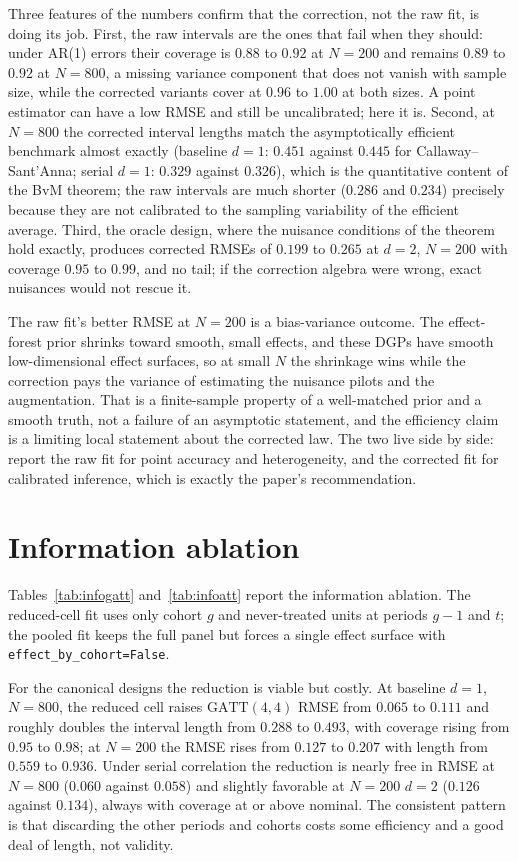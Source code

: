 \documentclass[11pt]{article}
\begin{document}
Three features of the numbers confirm that the correction, not the raw fit, is doing its
job. First, the raw intervals are the ones that fail when they should: under AR(1)
errors their coverage is $0.88$ to $0.92$ at $N=200$ and remains $0.89$ to $0.92$ at
$N=800$, a missing variance component that does not vanish with sample size, while the
corrected variants cover at $0.96$ to $1.00$ at both sizes. A point estimator can have a
low RMSE and still be uncalibrated; here it is. Second, at $N=800$ the corrected
interval lengths match the asymptotically efficient benchmark almost exactly (baseline
$d=1$: $0.451$ against $0.445$ for Callaway--Sant'Anna; serial $d=1$: $0.329$ against
$0.326$), which is the quantitative content of the BvM theorem; the raw intervals are
much shorter ($0.286$ and $0.234$) precisely because they are not calibrated to the
sampling variability of the efficient average. Third, the oracle design, where the
nuisance conditions of the theorem hold exactly, produces corrected RMSEs of $0.199$ to
$0.265$ at $d=2$, $N=200$ with coverage $0.95$ to $0.99$, and no tail; if the
correction algebra were wrong, exact nuisances would not rescue it.

The raw fit's better RMSE at $N=200$ is a bias-variance outcome. The effect-forest prior
shrinks toward smooth, small effects, and these DGPs have smooth low-dimensional effect
surfaces, so at small $N$ the shrinkage wins while the correction pays the variance of
estimating the nuisance pilots and the augmentation. That is a finite-sample property of
a well-matched prior and a smooth truth, not a failure of an asymptotic statement, and
the efficiency claim is a limiting local statement about the corrected law. The two live
side by side: report the raw fit for point accuracy and heterogeneity, and the corrected
fit for calibrated inference, which is exactly the paper's recommendation.

\section{Information ablation}
\label{sec:information}

Tables~\ref{tab:infogatt} and~\ref{tab:infoatt} report the information ablation.
The reduced-cell fit uses only cohort $g$ and never-treated units at periods $g-1$ and
$t$; the pooled fit keeps the full panel but forces a single effect surface with
\texttt{effect\_by\_cohort=False}.

For the canonical designs the reduction is viable but costly. At baseline $d=1$,
$N=800$, the reduced cell raises $\mathrm{GATT}(4,4)$ RMSE from $0.065$ to $0.111$ and
roughly doubles the interval length from $0.288$ to $0.493$, with coverage rising from
$0.95$ to $0.98$; at $N=200$ the RMSE rises from $0.127$ to $0.207$ with length from
$0.559$ to $0.936$. Under serial correlation the reduction is nearly free in RMSE at
$N=800$ ($0.060$ against $0.058$) and slightly favorable at $N=200$ $d=2$ ($0.126$
against $0.134$), always with coverage at or above nominal. The consistent pattern is
that discarding the other periods and cohorts costs some efficiency and a good deal of
length, not validity.
\end{document}
